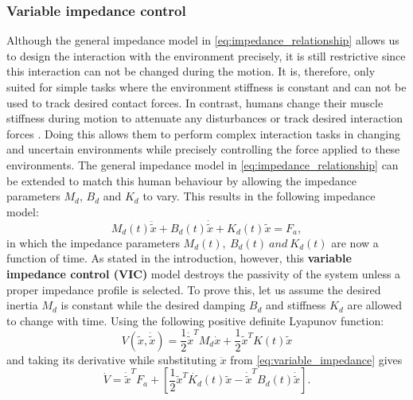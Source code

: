 \subsubsection{Variable impedance control}
\label{section:variable_impedance_control}

Although the general impedance model in \eqref{eq:impedance_relationship} allows us to design the interaction with the environment precisely, it is still restrictive since this interaction can not be changed during the motion. It is, therefore, only suited for simple tasks where the environment stiffness is constant and can not be used to track desired contact forces. In contrast, humans change their muscle stiffness during motion to attenuate any disturbances or track desired interaction forces \cite{tomoriVariableImpedanceControl2013}. Doing this allows them to perform complex interaction tasks in changing and uncertain environments while precisely controlling the force applied to these environments. The general impedance model in \eqref{eq:impedance_relationship} can be extended to match this human behaviour by allowing the impedance parameters $M_d$, $B_d$ and $K_d$ to vary. This results in the following impedance model:
\begin{equation} \label{eq:variable_impedance}
  M_d\left(t \right)\ddot{\widetilde{ x }} + B_d \left( t \right)\dot{\widetilde{ x }} + K_d \left( t \right)\widetilde{ x }= F_a,
\end{equation}
in which the impedance parameters $M_d \left( t \right), \ B_d \left( t \right)\ and\ K_d \left( t \right)$ are now a function of time. As stated in the introduction, however, this \textbf{variable impedance control (VIC)} model destroys the passivity of the system unless a proper impedance profile is selected. To prove this, let us assume the desired inertia $M_d$ is constant while the desired damping $B_d$ and stiffness $K_d$ are allowed to change with time. Using the following positive definite Lyapunov function:
\begin{equation}
  V \left(\widetilde{ x }, \dot{\widetilde{ x }}\right)=\frac{ 1 }{ 2 }{\dot{\widetilde{ x }}}^T M_d \dot{ x }+\frac{ 1 }{ 2 }{\widetilde{ x }}^T K \left( t \right)\widetilde{ x }
\end{equation}
and taking its derivative while substituting $\ddot{ x }$ from \eqref{eq:variable_impedance} gives
\begin{equation} \label{eq:variable_impedance_derivative}
  \dot{V} = \dot{\widetilde{x}}^T F_a + \left[\frac{1}{2}\widetilde{x}^T \dot{K_d}\left(t \right)\widetilde{ x }-\dot{\widetilde{ x }}^T B_d \left( t \right)\dot{\widetilde{ x }}\right].
\end{equation}
